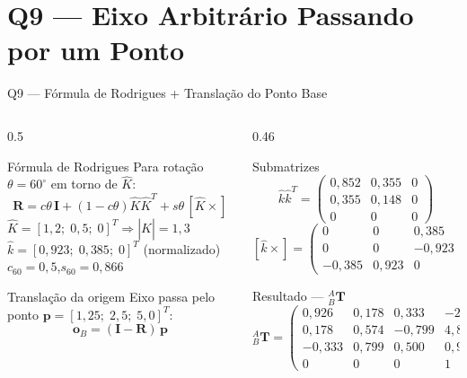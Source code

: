 \documentclass[aspectratio=169,12pt]{beamer}
\newcommand{\Trans}[2]{{}^{#1}_{#2}\!\mathbf{T}}
\newcommand{\degr}{^{\circ}}
\newcommand{\mat}[1]{\begin{pmatrix}#1\end{pmatrix}}
\begin{document}
\section{Q9 --- Eixo Arbitrário Passando por um Ponto}

\begin{frame}{Q9 --- Fórmula de Rodrigues + Translação do Ponto Base}
  \begin{columns}
    \begin{column}{0.5\textwidth}
      \begin{block}{Fórmula de Rodrigues}
        Para rotação $\theta=60\degr$ em torno de $\hat{K}$:
        \[
          \mathbf{R} = c\theta\,\mathbf{I} + (1-c\theta)\hat{K}\hat{K}^T + s\theta\,[\hat{K}\times]
        \]
        \small
        $\hat{K}=[1{,}2;\;0{,}5;\;0]^T \Rightarrow |\hat{K}|=1{,}3$\\
        $\hat{k}=[0{,}923;\;0{,}385;\;0]^T$ (normalizado)\\[4pt]
        $c_{60}=0{,}5$,\quad $s_{60}=0{,}866$
      \end{block}
      \begin{block}{Translação da origem}
        Eixo passa pelo ponto $\mathbf{p}=[1{,}25;\;2{,}5;\;5{,}0]^T$:
        \[
          \mathbf{o}_B = (\mathbf{I}-\mathbf{R})\,\mathbf{p}
        \]
      \end{block}
    \end{column}
    \begin{column}{0.46\textwidth}
      \begin{block}{Submatrizes}
        \small
        \[
          \hat{k}\hat{k}^T=\mat{0{,}852&0{,}355&0\\0{,}355&0{,}148&0\\0&0&0}
        \]
        \[
          [\hat{k}\times]=\mat{0&0&0{,}385\\0&0&-0{,}923\\-0{,}385&0{,}923&0}
        \]
      \end{block}
      \begin{exampleblock}{Resultado --- ${}^{A}_{B}\mathbf{T}$}
        \tiny
        $\Trans{A}{B}=\mat{
          0{,}926 & 0{,}178 & 0{,}333 & -2{,}017\\
          0{,}178 & 0{,}574 &-0{,}799 &  4{,}840\\
         -0{,}333 & 0{,}799 & 0{,}500 &  0{,}918\\
          0 & 0 & 0 & 1}$
      \end{exampleblock}
    \end{column}
  \end{columns}
\end{frame}
\end{document}
